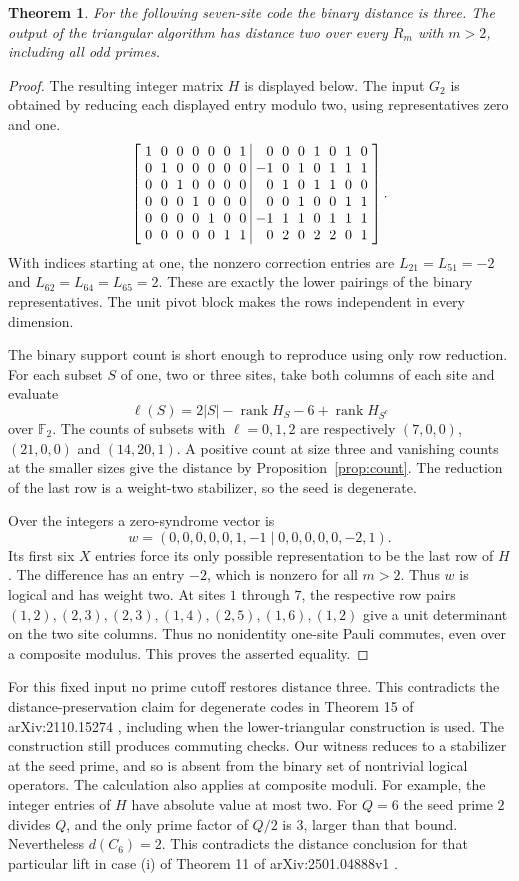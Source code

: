 \documentclass[11pt]{article}
\newtheorem{theorem}{Theorem}
\newcommand{\F}{\mathbb F}
\newcommand{\rank}{\operatorname{rank}}
\begin{document}
\begin{theorem}\label{thm:seven}
For the following seven-site code the binary distance is three. The output of the triangular algorithm has distance two over every $R_m$ with $m>2$, including all odd primes.
\end{theorem}
\begin{proof}
The resulting integer matrix $H$ is displayed below. The input $G_2$ is obtained by reducing each displayed entry modulo two, using representatives zero and one.
\[
\setlength{\arraycolsep}{3.1pt}
\left[\begin{array}{rrrrrrr|rrrrrrr}
1&0&0&0&0&0&1&0&0&0&1&0&1&0\\
0&1&0&0&0&0&0&-1&0&1&0&1&1&1\\
0&0&1&0&0&0&0&0&1&0&1&1&0&0\\
0&0&0&1&0&0&0&0&0&1&0&0&1&1\\
0&0&0&0&1&0&0&-1&1&1&0&1&1&1\\
0&0&0&0&0&1&1&0&2&0&2&2&0&1
\end{array}\right].
\]
With indices starting at one, the nonzero correction entries are $L_{21}=L_{51}=-2$ and $L_{62}=L_{64}=L_{65}=2$. These are exactly the lower pairings of the binary representatives. The unit pivot block makes the rows independent in every dimension.

The binary support count is short enough to reproduce using only row reduction. For each subset $S$ of one, two or three sites, take both columns of each site and evaluate
\[
 \ell(S)=2|S|-\rank H_S-6+\rank H_{S^c}
\]
over $\F_2$. The counts of subsets with $\ell=0,1,2$ are respectively $(7,0,0)$, $(21,0,0)$ and $(14,20,1)$. A positive count at size three and vanishing counts at the smaller sizes give the distance by Proposition~\ref{prop:count}. The reduction of the last row is a weight-two stabilizer, so the seed is degenerate.

Over the integers a zero-syndrome vector is
\[
 w=(0,0,0,0,0,1,-1\mid 0,0,0,0,0,-2,1).
\]
Its first six $X$ entries force its only possible representation to be the last row of $H$. The difference has an entry $-2$, which is nonzero for all $m>2$. Thus $w$ is logical and has weight two. At sites $1$ through $7$, the respective row pairs $(1,2),(2,3),(2,3),(1,4),(2,5),(1,6),(1,2)$ give a unit determinant on the two site columns. Thus no nonidentity one-site Pauli commutes, even over a composite modulus. This proves the asserted equality.
\end{proof}
For this fixed input no prime cutoff restores distance three. This contradicts the distance-preservation claim for degenerate codes in Theorem 15 of arXiv:2110.15274 \cite{ldi22}, including when the lower-triangular construction is used. The construction still produces commuting checks. Our witness reduces to a stabilizer at the seed prime, and so is absent from the binary set of nontrivial logical operators. The calculation also applies at composite moduli. For example, the integer entries of $H$ have absolute value at most two. For $Q=6$ the seed prime $2$ divides $Q$, and the only prime factor of $Q/2$ is $3$, larger than that bound. Nevertheless $d(C_6)=2$. This contradicts the distance conclusion for that particular lift in case (i) of Theorem 11 of arXiv:2501.04888v1 \cite{ldi25}.
\end{document}
